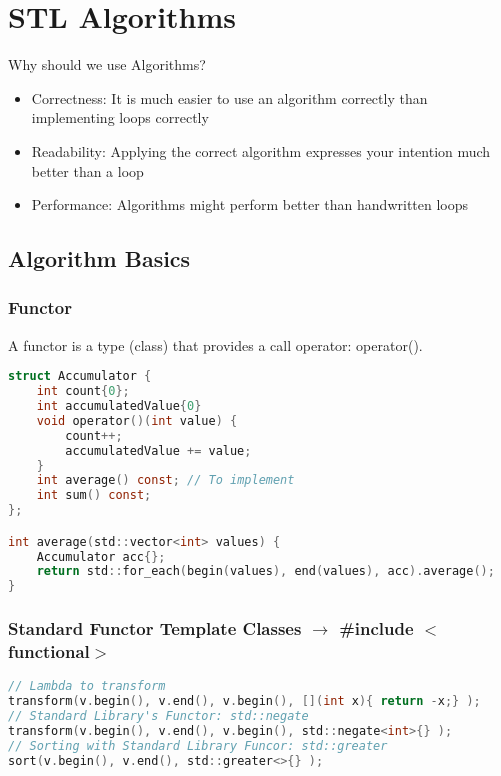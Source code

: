 
\section{STL Algorithms}

Why should we use Algorithms?
\begin{itemize}
    \item Correctness: It is much easier to use an algorithm correctly than implementing loops correctly
    \item Readability: Applying the correct algorithm expresses your intention much better than a loop
    \item Performance: Algorithms might perform better than handwritten loops
\end{itemize}
\subsection{Algorithm Basics}
\subsubsection{Functor}
A functor is a type (class) that provides a call operator: operator().
\begin{lstlisting}[style=frame, style= linenumbers, language=C]
struct Accumulator {
    int count{0};
    int accumulatedValue{0}
    void operator()(int value) {
        count++;
        accumulatedValue += value;
    }
    int average() const; // To implement
    int sum() const;
};

int average(std::vector<int> values) {
    Accumulator acc{};
    return std::for_each(begin(values), end(values), acc).average();
}
\end{lstlisting}

\subsubsection{Standard Functor Template Classes $\rightarrow$ \#include $<$functional$>$}
\begin{lstlisting}[style=frame, style= linenumbers, language=C]
// Lambda to transform
transform(v.begin(), v.end(), v.begin(), [](int x){ return -x;} );
// Standard Library's Functor: std::negate
transform(v.begin(), v.end(), v.begin(), std::negate<int>{} );
// Sorting with Standard Library Funcor: std::greater
sort(v.begin(), v.end(), std::greater<>{} );
\end{lstlisting}
